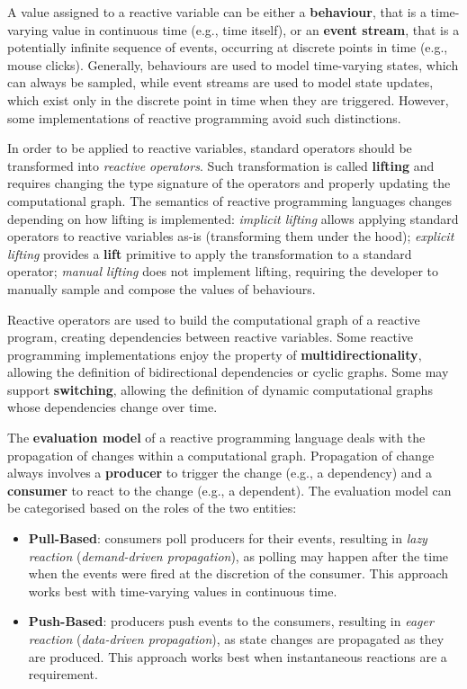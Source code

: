 A value assigned to a reactive variable can be either a \textbf{behaviour},
that is a time-varying value in continuous time (e.g., time itself), or an
\textbf{event stream}, that is a potentially infinite sequence of events,
occurring at discrete points in time (e.g., mouse clicks). Generally,
behaviours are used to model time-varying states, which can always be sampled,
while event streams are used to model state updates, which exist only in the
discrete point in time when they are triggered. However, some implementations
of reactive programming avoid such distinctions.

In order to be applied to reactive variables, standard operators should be
transformed into \textit{reactive operators}. Such transformation is called
\textbf{lifting} and requires changing the type signature of the operators and
properly updating the computational graph. The semantics of reactive
programming languages changes depending on how lifting is implemented:
\textit{implicit lifting} allows applying standard operators to reactive
variables as-is (transforming them under the hood); \textit{explicit lifting}
provides a \textbf{lift} primitive to apply the transformation to a standard
operator; \textit{manual lifting} does not implement lifting, requiring the
developer to manually sample and compose the values of behaviours.

Reactive operators are used to build the computational graph of a reactive
program, creating dependencies between reactive variables. Some reactive
programming implementations enjoy the property of \textbf{multidirectionality},
allowing the definition of bidirectional dependencies or cyclic graphs. Some
may support \textbf{switching}, allowing the definition of dynamic
computational graphs whose dependencies change over time.

The \textbf{evaluation model} of a reactive programming language deals with the
propagation of changes within a computational graph. Propagation of change
always involves a \textbf{producer} to trigger the change (e.g., a dependency)
and a \textbf{consumer} to react to the change (e.g., a dependent). The
evaluation model can be categorised based on the roles of the two entities:
\begin{itemize}
  \item \textbf{Pull-Based}: consumers poll producers for their events,
        resulting in \textit{lazy reaction} (\textit{demand-driven propagation}),
        as polling may happen after the time when the events were fired at the
        discretion of the consumer. This approach works best with time-varying
        values in continuous time.
  \item \textbf{Push-Based}: producers push events to the consumers, resulting
        in \textit{eager reaction} (\textit{data-driven propagation}), as state
        changes are propagated as they are produced. This approach works best
        when instantaneous reactions are a requirement.
\end{itemize}

